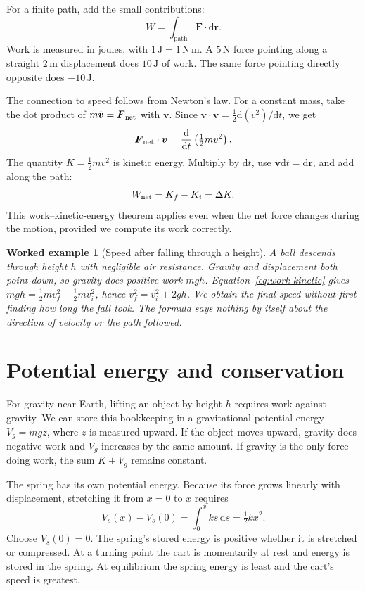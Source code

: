 \documentclass[11pt,oneside]{book}
\newcommand{\dd}{\mathrm{d}}
\newcommand{\vect}[1]{\boldsymbol{#1}}
\newcommand{\od}[2]{\frac{\dd #1}{\dd #2}}
\theoremstyle{reviewstyle}
\newtheorem{example}{Worked example}[chapter]
\begin{document}
For a finite path, add the small contributions:
\begin{equation}
W=\int_{\mathrm{path}}\vect F\cdot\dd\vect r.
\end{equation}
Work is measured in joules, with $1\,\mathrm J=1\,\mathrm{N\,m}$. A $5\,\mathrm N$ force pointing along a straight $2\,\mathrm m$ displacement does $10\,\mathrm J$ of work. The same force pointing directly opposite does $-10\,\mathrm J$.

The connection to speed follows from Newton's law. For a constant mass, take the dot product of $m\dot{\vect v}=\vect F_{\rm net}$ with $\vect v$. Since $\vect v\cdot\dot{\vect v}=\tfrac12\dd(v^2)/\dd t$, we get
\begin{equation}
\vect F_{\rm net}\cdot\vect v
=\od{}{t}\left(\tfrac12mv^2\right).
\end{equation}
The quantity $K=\tfrac12mv^2$ is kinetic energy. Multiply by $\dd t$, use $\vect v\dd t=\dd\vect r$, and add along the path:
\begin{equation}
W_{\rm net}=K_f-K_i=\Delta K.
\label{eq:work-kinetic}
\end{equation}
This work--kinetic-energy theorem applies even when the net force changes during the motion, provided we compute its work correctly.

\begin{example}[Speed after falling through a height]
A ball descends through height $h$ with negligible air resistance. Gravity and displacement both point down, so gravity does positive work $mgh$. Equation~\eqref{eq:work-kinetic} gives $mgh=\tfrac12m v_f^2-\tfrac12m v_i^2$, hence $v_f^2=v_i^2+2gh$. We obtain the final speed without first finding how long the fall took. The formula says nothing by itself about the direction of velocity or the path followed.
\end{example}

\section{Potential energy and conservation}
For gravity near Earth, lifting an object by height $h$ requires work against gravity. We can store this bookkeeping in a gravitational potential energy $V_g=mgz$, where $z$ is measured upward. If the object moves upward, gravity does negative work and $V_g$ increases by the same amount. If gravity is the only force doing work, the sum $K+V_g$ remains constant.

The spring has its own potential energy. Because its force grows linearly with displacement, stretching it from $x=0$ to $x$ requires
\begin{equation}
V_s(x)-V_s(0)=\int_0^x ks\,\dd s=\tfrac12kx^2.
\end{equation}
Choose $V_s(0)=0$. The spring's stored energy is positive whether it is stretched or compressed. At a turning point the cart is momentarily at rest and energy is stored in the spring. At equilibrium the spring energy is least and the cart's speed is greatest.
\end{document}
